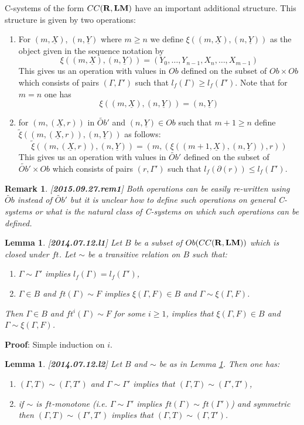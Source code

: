 \documentclass[11pt]{article}
\newenvironment{proof}{{\bf Proof}:}{\vskip 5mm }
\newtheorem{lemma}[proposition]{Lemma}
\newtheorem{remark}[proposition]{Remark}
\newcommand{\llabel}[1]{\label{#1}[{\bf #1}]}
\newcommand{\rr}{{\bf R}}
\newcommand{\lm}{{\bf LM}}
\newcommand{\uu}{\underline}
\newcommand{\wt}{\widetilde}
\begin{document}
C-systems of the form $CC(\rr,\lm)$ have an important additional structure. This structure is given by two operations:
%
\begin{enumerate}
\item For $(m,\uu{X})$, $(n,\uu{Y})$ where $m\ge n$ we define $\xi((m,\uu{X}),(n,\uu{Y}))$ as the object given in the sequence notation by 
%
$$\xi((m,\uu{X}),(n,\uu{Y}))=(Y_0,\dots,Y_{n-1},X_n,\dots,X_{m-1})$$
%
This gives us an operation with values in $Ob$ defined on the subset of $Ob\times Ob$ which consists of pairs $(\Gamma,\Gamma')$ such that $l_f(\Gamma)\ge l_f(\Gamma')$. Note that for $m=n$ one has 
%
$$\xi((m,\uu{X}),(n,\uu{Y}))=(n,\uu{Y})$$
%
\item for $(m,(\uu{X},r))$ in $\wt{Ob}'$ and $(n,\uu{Y})\in Ob$ such that $m+1\ge n$ define $\wt{\xi}((m,(\uu{X},r)),(n,\uu{Y}))$ as follows:
%
$$\wt{\xi}((m,(\uu{X},r)),(n,\uu{Y}))=(m, (\xi((m+1,\uu{X}),(n,\uu{Y})),r))$$
%
This gives us an operation with values in $\wt{Ob}'$ defined on the subset of $\wt{Ob}'\times Ob$ which consists of pairs $(r,\Gamma')$ such that $l_f(\partial(r))\le l_f(\Gamma')$.
\end{enumerate}
%
\begin{remark}\rm
\llabel{2015.09.27.rem1}
Both operations can be easily re-written using $\wt{Ob}$ instead of $\wt{Ob}'$ but it is unclear how to define such operations on general C-systems or what is the natural class of C-systems on which such operations can be defined. 
\end{remark}
%
\begin{lemma}
\llabel{2014.07.12.l1}
Let $B$ be a subset of $Ob(CC(\rr,\lm))$ which is closed under $ft$. Let $\sim$ be a transitive relation on $B$ such that:
%
\begin{enumerate}
\item $\Gamma\sim \Gamma'$ implies $l_f(\Gamma)=l_f(\Gamma')$,
\item $\Gamma\in B$ and $ft(\Gamma)\sim F$ implies $\xi(\Gamma,F)\in B$ and $\Gamma\sim \xi(\Gamma,F)$.
\end{enumerate}
%
Then $\Gamma\in B$ and $ft^i(\Gamma)\sim F$ for some $i\ge 1$, implies that $\xi(\Gamma,F)\in B$ and $\Gamma\sim \xi(\Gamma,F)$. 
\end{lemma}
%
\begin{proof}
Simple induction on $i$.
\end{proof}
%
\begin{lemma}
\llabel{2014.07.12.l2}
Let $B$ and $\sim$ be as in Lemma \ref{2014.07.12.l1}. Then one has:
%
\begin{enumerate}
\item $(\Gamma,T)\sim (\Gamma,T')$ and $\Gamma\sim \Gamma'$ implies that $(\Gamma,T)\sim (\Gamma',T')$,
\item if $\sim$ is $ft$-monotone (i.e. $\Gamma\sim \Gamma'$ implies $ft(\Gamma)\sim ft(\Gamma')$) and symmetric then $(\Gamma,T)\sim (\Gamma',T')$ implies that $(\Gamma,T)\sim (\Gamma,T')$.
\end{enumerate}
\end{lemma}
\end{document}
